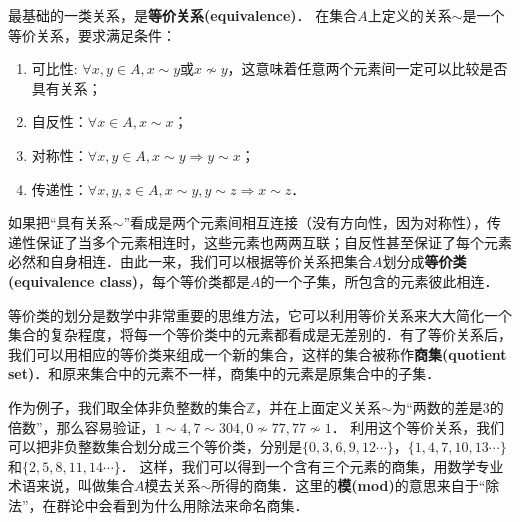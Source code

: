 最基础的一类关系，是\textbf{等价关系(equivalence)}． 在集合$A$上定义的关系$\sim$是一个等价关系，要求满足条件：
\begin{enumerate}
\item 可比性: $\forall x, y\in A, x\sim y \text{或} x\not\sim y$，这意味着任意两个元素间一定可以比较是否具有关系；
\item 自反性：$\forall x\in A, x\sim x$；
\item 对称性：$\forall x, y\in A, x\sim y \Rightarrow y\sim x$；
\item 传递性：$\forall x, y, z\in A, x\sim y, y\sim z\Rightarrow x\sim z$．
\end{enumerate}
如果把“具有关系$\sim$”看成是两个元素间相互连接（没有方向性，因为对称性），传递性保证了当多个元素相连时，这些元素也两两互联；自反性甚至保证了每个元素必然和自身相连．由此一来，我们可以根据等价关系把集合$A$划分成\textbf{等价类(equivalence class)}，每个等价类都是$A$的一个子集，所包含的元素彼此相连．

等价类的划分是数学中非常重要的思维方法，它可以利用等价关系来大大简化一个集合的复杂程度，将每一个等价类中的元素都看成是无差别的．有了等价关系后，我们可以用相应的等价类来组成一个新的集合，这样的集合被称作\textbf{商集(quotient set)}．和原来集合中的元素不一样，商集中的元素是原集合中的子集．

作为例子，我们取全体非负整数的集合$\mathbb{Z}$，并在上面定义关系$\sim$为“两数的差是3的倍数”，那么容易验证，$1\sim4, 7\sim304, 0\not\sim 77, 77\not\sim 1$． 利用这个等价关系，我们可以把非负整数集合划分成三个等价类，分别是$\{0, 3, 6, 9, 12\cdots \}$，$\{1, 4, 7, 10, 13\cdots\}$和$\{2, 5, 8, 11, 14\cdots\}$． 这样，我们可以得到一个含有三个元素的商集，用数学专业术语来说，叫做集合$A$模去关系$\sim$所得的商集．这里的\textbf{模(mod)}的意思来自于“除法”，在群论中会看到为什么用除法来命名商集．


